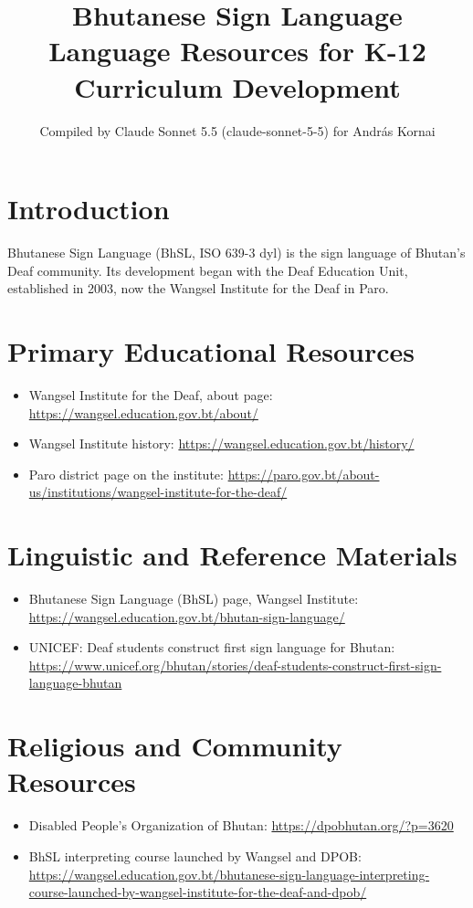 \documentclass[12pt]{article}
\title{Bhutanese Sign Language Language Resources for K-12 Curriculum Development}
\author{Compiled by Claude Sonnet 5.5 (claude-sonnet-5-5) for Andr\'as Kornai}
\date{}
\begin{document}
\maketitle

\section{Introduction}
Bhutanese Sign Language (BhSL, ISO 639-3 dyl) is the sign language of Bhutan's Deaf community. Its development began with the Deaf Education Unit, established in 2003, now the Wangsel Institute for the Deaf in Paro.

\section{Primary Educational Resources}
\begin{itemize}
\item Wangsel Institute for the Deaf, about page: \url{https://wangsel.education.gov.bt/about/}
\item Wangsel Institute history: \url{https://wangsel.education.gov.bt/history/}
\item Paro district page on the institute: \url{https://paro.gov.bt/about-us/institutions/wangsel-institute-for-the-deaf/}
\end{itemize}

\section{Linguistic and Reference Materials}
\begin{itemize}
\item Bhutanese Sign Language (BhSL) page, Wangsel Institute: \url{https://wangsel.education.gov.bt/bhutan-sign-language/}
\item UNICEF: Deaf students construct first sign language for Bhutan: \url{https://www.unicef.org/bhutan/stories/deaf-students-construct-first-sign-language-bhutan}
\end{itemize}

\section{Religious and Community Resources}
\begin{itemize}
\item Disabled People's Organization of Bhutan: \url{https://dpobhutan.org/?p=3620}
\item BhSL interpreting course launched by Wangsel and DPOB: \url{https://wangsel.education.gov.bt/bhutanese-sign-language-interpreting-course-launched-by-wangsel-institute-for-the-deaf-and-dpob/}
\end{itemize}
\end{document}

